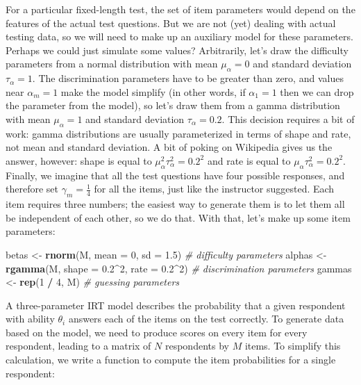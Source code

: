 \documentclass[
]{book}
\newenvironment{Shaded}{\begin{snugshade}}{\end{snugshade}}
\newcommand{\AttributeTok}[1]{\textcolor[rgb]{0.13,0.29,0.53}{#1}}
\newcommand{\CommentTok}[1]{\textcolor[rgb]{0.56,0.35,0.01}{\textit{#1}}}
\newcommand{\DecValTok}[1]{\textcolor[rgb]{0.00,0.00,0.81}{#1}}
\newcommand{\FloatTok}[1]{\textcolor[rgb]{0.00,0.00,0.81}{#1}}
\newcommand{\FunctionTok}[1]{\textcolor[rgb]{0.13,0.29,0.53}{\textbf{#1}}}
\newcommand{\NormalTok}[1]{#1}
\newcommand{\OtherTok}[1]{\textcolor[rgb]{0.56,0.35,0.01}{#1}}
\newcommand{\SpecialCharTok}[1]{\textcolor[rgb]{0.81,0.36,0.00}{\textbf{#1}}}
\begin{document}
For a particular fixed-length test, the set of item parameters would depend on the features of the actual test questions.
But we are not (yet) dealing with actual testing data, so we will need to make up an auxiliary model for these parameters.
Perhaps we could just simulate some values?
Arbitrarily, let's draw the difficulty parameters from a normal distribution with mean \(\mu_\alpha = 0\) and standard deviation \(\tau_\alpha = 1\).
The discrimination parameters have to be greater than zero, and values near \(\alpha_m = 1\) make the model simplify (in other words, if \(\alpha_1 = 1\) then we can drop the parameter from the model), so let's draw them from a gamma distribution with mean \(\mu_\alpha = 1\) and standard deviation \(\tau_\alpha = 0.2\).
This decision requires a bit of work: gamma distributions are usually parameterized in terms of shape and rate, not mean and standard deviation.
A bit of poking on Wikipedia gives us the answer, however:
shape is equal to \(\mu_\alpha^2 \tau_\alpha^2 = 0.2^2\) and rate is equal to \(\mu_\alpha \tau_\alpha^2 = 0.2^2\).
Finally, we imagine that all the test questions have four possible responses, and therefore set \(\gamma_m = \frac{1}{4}\) for all the items, just like the instructor suggested.
Each item requires three numbers; the easiest way to generate them is to let them all be independent of each other, so we do that.
With that, let's make up some item parameters:

\begin{Shaded}
\begin{Highlighting}[]
\NormalTok{betas }\OtherTok{\textless{}{-}} \FunctionTok{rnorm}\NormalTok{(M, }\AttributeTok{mean =} \DecValTok{0}\NormalTok{, }\AttributeTok{sd =} \FloatTok{1.5}\NormalTok{)           }\CommentTok{\# difficulty parameters}
\NormalTok{alphas }\OtherTok{\textless{}{-}} \FunctionTok{rgamma}\NormalTok{(M, }\AttributeTok{shape =} \FloatTok{0.2}\SpecialCharTok{\^{}}\DecValTok{2}\NormalTok{, }\AttributeTok{rate =} \FloatTok{0.2}\SpecialCharTok{\^{}}\DecValTok{2}\NormalTok{)  }\CommentTok{\# discrimination parameters}
\NormalTok{gammas }\OtherTok{\textless{}{-}} \FunctionTok{rep}\NormalTok{(}\DecValTok{1} \SpecialCharTok{/} \DecValTok{4}\NormalTok{, M)                          }\CommentTok{\# guessing parameters}
\end{Highlighting}
\end{Shaded}

A three-parameter IRT model describes the probability that a given respondent with ability \(\theta_i\) answers each of the items on the test correctly.
To generate data based on the model, we need to produce scores on every item for every respondent, leading to a matrix of \(N\) respondents by \(M\) items.
To simplify this calculation, we write a function to compute the item probabilities for a single respondent:
\end{document}
